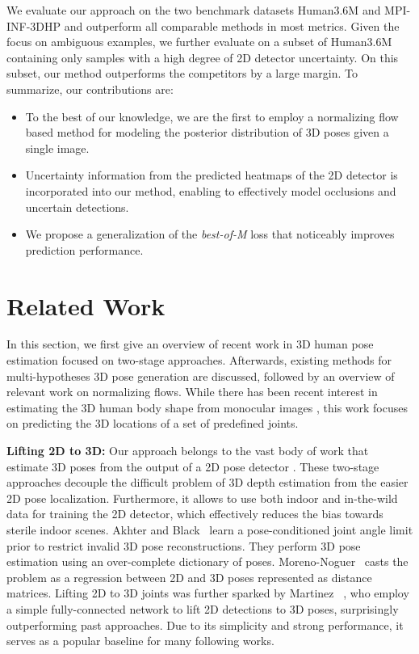 \documentclass[10pt,twocolumn,letterpaper]{article}
\begin{document}
We evaluate our approach on the two benchmark datasets Human3.6M \cite{h36m_pami} and MPI-INF-3DHP \cite{mono-3dhp2017} and outperform all comparable methods in most metrics.
Given the focus on ambiguous examples, we further evaluate on a subset of Human3.6M containing only samples with a high degree of 2D detector uncertainty.
On this subset, our method outperforms the competitors by a large margin.
To summarize, our contributions are:
\begin{itemize}
    \item To the best of our knowledge, we are the first to employ a normalizing flow based method for modeling the posterior distribution of 3D poses given a single image.
    \item Uncertainty information from the predicted heatmaps of the 2D detector is incorporated into our method, enabling to effectively model occlusions and uncertain detections.
    \item We propose a generalization of the \textit{best-of-M} loss that noticeably improves prediction performance.
\end{itemize}

\section{Related Work}
In this section, we first give an overview of recent work in 3D human pose estimation focused on two-stage approaches. 
Afterwards, existing methods for multi-hypotheses 3D pose generation are discussed, followed by an overview of relevant work on normalizing flows.
While there has been recent interest in estimating the 3D human body shape from monocular images \cite{multi_bodies_biggs2020,KanazawaCVPR18,kocabas2019vibe,kolotouros2019spin,li21hybrik,pavlaCVPR18,xu2020ghum,Zanfir2020WeaklyS3},
this work focuses on predicting the 3D locations of a set of predefined joints.

\textbf{Lifting 2D to 3D:}
Our approach belongs to the vast body of work that estimate 3D poses from the output of a 2D pose detector
\cite{Chen_2017_CVPR,Ci_2019_ICCV,fang2018learning,inthewild3d_2019,Hossain2018ECCV,Li_2020_CVPR,PhysCapTOG2020,Wandt2019RepNet,WanRud2021a,DBLP:journals/corr/abs-1905-07862,Xu_2020_CVPR}. These two-stage approaches decouple the difficult problem of 3D depth estimation from the easier 2D pose localization. Furthermore, it allows to use both indoor and in-the-wild data for training the
2D detector, which effectively reduces the bias towards sterile indoor scenes. 
Akhter and Black~\cite{Akhter_2015_CVPR} learn a pose-conditioned joint angle limit prior to restrict invalid 3D pose reconstructions. They perform 3D pose estimation using an over-complete dictionary of poses. 
Moreno-Noguer~\cite{Moreno-Noguer_2017_CVPR} casts the problem as a regression between 2D and 3D poses represented as distance matrices.
Lifting 2D to 3D joints was further sparked by Martinez \etal~\cite{martinez_2017_3dbaseline}, who employ a simple fully-connected network to lift 2D detections to 3D poses, surprisingly outperforming past approaches.
Due to its simplicity and strong performance, it serves as a popular baseline for many following works.
\end{document}
